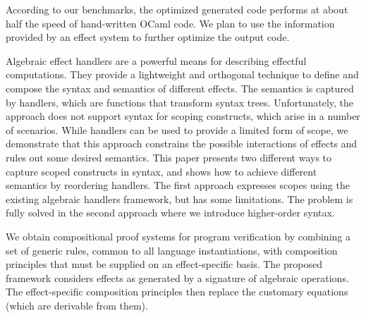 \documentclass[a4paper,UKenglish]{dagrep}
\begin{document}
According to our benchmarks, the optimized generated code performs at about half the speed of hand-written OCaml code. We plan to use the information provided by an effect system to further optimize the output code.

\license
{}

Algebraic effect handlers are a powerful means for describing
effectful computations. They provide a lightweight and orthogonal
technique to define and compose the syntax and semantics of
different effects. The semantics is captured by handlers, which are
functions that transform syntax trees.
Unfortunately, the approach does not support syntax for scoping
constructs, which arise in a number of scenarios. While handlers can
be used to provide a limited form of scope, we demonstrate that this
approach constrains the possible interactions of effects and rules out
some desired semantics.
This paper presents two different ways to capture scoped constructs
in syntax, and shows how to achieve different semantics by
reordering handlers. The first approach expresses scopes using the
existing algebraic handlers framework, but has some limitations. The
problem is fully solved in the second approach where we introduce
higher-order syntax.

\license

We obtain compositional proof systems for program verification by combining a set of generic rules, common to all language instantiations, with composition principles that must be supplied on an effect-specific basis. The proposed framework considers effects as generated by a signature of algebraic operations. The effect-specific composition principles then replace the customary equations (which are derivable from them).

\license
{}
\end{document}
